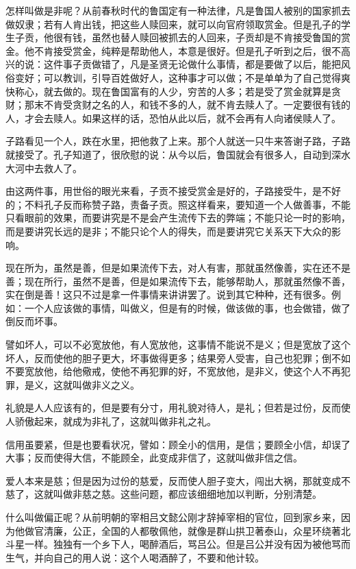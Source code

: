 \documentclass[12pt,twoside,openany]{book}
\begin{document}
怎样叫做是非呢？从前春秋时代的鲁国定有一种法律，凡是鲁国人被别的国家抓去做奴隶；若有人肯出钱，把这些人赎回来，就可以向官府领取赏金。但是孔子的学生子贡，他很有钱，虽然也替人赎回被抓去的人回来，子贡却是不肯接受鲁国的赏金。他不肯接受赏金，纯粹是帮助他人，本意是很好。但是孔子听到之后，很不高兴的说：这件事子贡做错了，凡是圣贤无论做什么事情，都是要做了以后，能把风俗变好；可以教训，引导百姓做好人，这种事才可以做；不是单单为了自己觉得爽快称心，就去做的。现在鲁国富有的人少，穷苦的人多；若是受了赏金就算是贪财；那末不肯受贪财之名的人，和钱不多的人，就不肯去赎人了。一定要很有钱的人，才会去赎人。如果这样的话，恐怕从此以后，就不会再有人向诸侯赎人了。

子路看见一个人，跌在水里，把他救了上来。那个人就送一只牛来答谢子路，子路就接受了。孔子知道了，很欣慰的说：从今以后，鲁国就会有很多人，自动到深水大河中去救人了。

由这两件事，用世俗的眼光来看，子贡不接受赏金是好的，子路接受牛，是不好的；不料孔子反而称赞子路，责备子贡。照这样看来，要知道一个人做善事，不能只看眼前的效果，而要讲究是不是会产生流传下去的弊端；不能只论一时的影响，而是要讲究长远的是非；不能只论个人的得失，而是要讲究它关系天下大众的影响。

现在所为，虽然是善，但是如果流传下去，对人有害，那就虽然像善，实在还不是善；现在所行，虽然不是善，但是如果流传下去，能够帮助人，那就虽然像不善，实在倒是善！这只不过是拿一件事情来讲讲罢了。说到其它种种，还有很多。例如：一个人应该做的事情，叫做义，但是有的时候，做该做的事，也会做错，做了倒反而坏事。

譬如坏人，可以不必宽放他，有人宽放他，这事情不能说不是义；但是宽放了这个坏人，反而使他的胆子更大，坏事做得更多；结果旁人受害，自己也犯罪；倒不如不要宽放他，给他儆戒，使他不再犯罪的好，不宽放他，是非义，使这个人不再犯罪，是义，这就叫做非义之义。

礼貌是人人应该有的，但是要有分寸，用礼貌对待人，是礼；但若是过份，反而使人骄傲起来，就成为非礼了，这就叫做非礼之礼。

信用虽要紧，但是也要看状况，譬如：顾全小的信用，是信；要顾全小信，却误了大事；反而使得大信，不能顾全，此变成非信了，这就叫做非信之信。

爱人本来是慈；但是因为过份的慈爱，反而使人胆子变大，闯出大祸，那就变成不慈了，这就叫做非慈之慈。这些问题，都应该细细地加以判断，分别清楚。

什么叫做偏正呢？从前明朝的宰相吕文懿公刚才辞掉宰相的官位，回到家乡来，因为他做官清廉，公正，全国的人都敬佩他，就像是群山拱卫著泰山，众星环绕著北斗星一样。独独有一个乡下人，喝醉酒后，骂吕公。但是吕公并没有因为被他骂而生气，并向自己的用人说：这个人喝酒醉了，不要和他计较。
\end{document}
